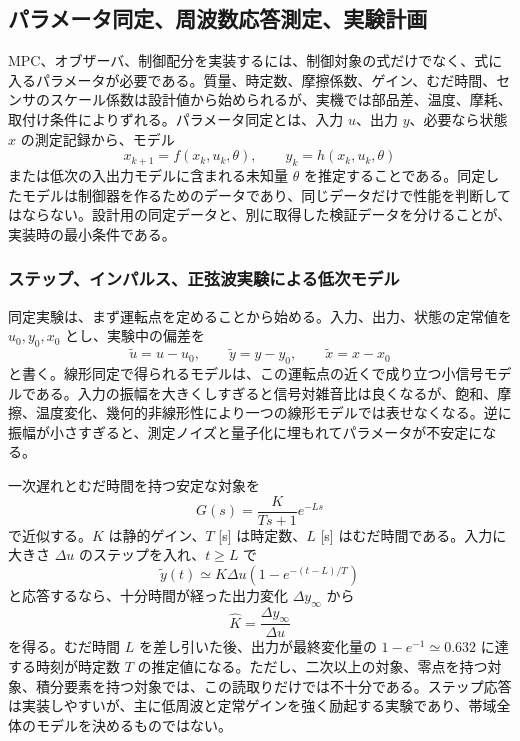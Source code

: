 \subsection{パラメータ同定、周波数応答測定、実験計画}

MPC、オブザーバ、制御配分を実装するには、制御対象の式だけでなく、式に入るパラメータが必要である。質量、時定数、摩擦係数、ゲイン、むだ時間、センサのスケール係数は設計値から始められるが、実機では部品差、温度、摩耗、取付け条件によりずれる。パラメータ同定とは、入力 $u$、出力 $y$、必要なら状態 $x$ の測定記録から、モデル
\begin{equation}
  x_{k+1}=f(x_k,u_k,\theta),
  \qquad
  y_k=h(x_k,u_k,\theta)
\end{equation}
または低次の入出力モデルに含まれる未知量 $\theta$ を推定することである。同定したモデルは制御器を作るためのデータであり、同じデータだけで性能を判断してはならない。設計用の同定データと、別に取得した検証データを分けることが、実装時の最小条件である。

\subsubsection{ステップ、インパルス、正弦波実験による低次モデル}

同定実験は、まず運転点を定めることから始める。入力、出力、状態の定常値を $u_0,y_0,x_0$ とし、実験中の偏差を
\begin{equation}
  \tilde{u}=u-u_0,
  \qquad
  \tilde{y}=y-y_0,
  \qquad
  \tilde{x}=x-x_0
\end{equation}
と書く。線形同定で得られるモデルは、この運転点の近くで成り立つ小信号モデルである。入力の振幅を大きくしすぎると信号対雑音比は良くなるが、飽和、摩擦、温度変化、幾何的非線形性により一つの線形モデルでは表せなくなる。逆に振幅が小さすぎると、測定ノイズと量子化に埋もれてパラメータが不安定になる。

一次遅れとむだ時間を持つ安定な対象を
\begin{equation}
  G(s)=\frac{K}{Ts+1}e^{-Ls}
\end{equation}
で近似する。$K$ は静的ゲイン、$T$ [s] は時定数、$L$ [s] はむだ時間である。入力に大きさ $\Delta u$ のステップを入れ、$t\ge L$ で
\begin{equation}
  \tilde{y}(t)\simeq K\Delta u\left(1-e^{-(t-L)/T}\right)
\end{equation}
と応答するなら、十分時間が経った出力変化 $\Delta y_\infty$ から
\begin{equation}
  \hat{K}=\frac{\Delta y_\infty}{\Delta u}
\end{equation}
を得る。むだ時間 $L$ を差し引いた後、出力が最終変化量の $1-e^{-1}\simeq0.632$ に達する時刻が時定数 $T$ の推定値になる。ただし、二次以上の対象、零点を持つ対象、積分要素を持つ対象では、この読取りだけでは不十分である。ステップ応答は実装しやすいが、主に低周波と定常ゲインを強く励起する実験であり、帯域全体のモデルを決めるものではない。

